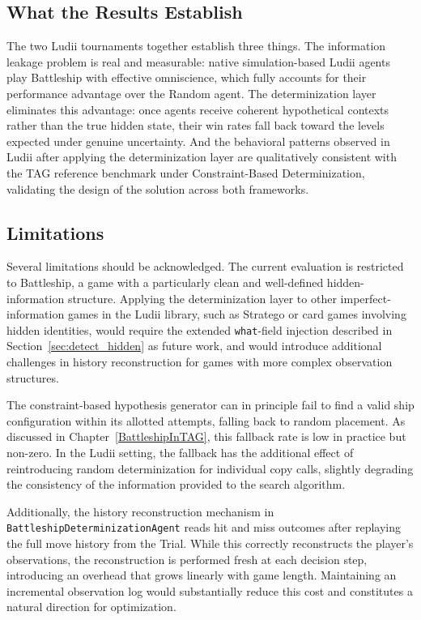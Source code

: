 \subsection{What the Results Establish}

The two Ludii tournaments together establish three things. The information leakage problem is real and measurable: native simulation-based Ludii agents play Battleship with effective omniscience, which fully accounts for their performance advantage over the Random agent. The determinization layer eliminates this advantage: once agents receive coherent hypothetical contexts rather than the true hidden state, their win rates fall back toward the levels expected under genuine uncertainty. And the behavioral patterns observed in Ludii after applying the determinization layer are qualitatively consistent with the TAG reference benchmark under Constraint-Based Determinization, validating the design of the solution across both frameworks.

\subsection{Limitations}

Several limitations should be acknowledged. The current evaluation is restricted to Battleship, a game with a particularly clean and well-defined hidden-information structure. Applying the determinization layer to other imperfect-information games in the Ludii library, such as Stratego or card games involving hidden identities, would require the extended \texttt{what}-field injection described in Section~\ref{sec:detect_hidden} as future work, and would introduce additional challenges in history reconstruction for games with more complex observation structures.

The constraint-based hypothesis generator can in principle fail to find a valid ship configuration within its allotted attempts, falling back to random placement. As discussed in Chapter~\ref{BattleshipInTAG}, this fallback rate is low in practice but non-zero. In the Ludii setting, the fallback has the additional effect of reintroducing random determinization for individual copy calls, slightly degrading the consistency of the information provided to the search algorithm.

Additionally, the history reconstruction mechanism in \newline
\texttt{BattleshipDeterminizationAgent} reads hit and miss 
outcomes after replaying the full move history from the Trial. 
While this correctly reconstructs the player's observations, 
the reconstruction is performed fresh at each decision step, 
introducing an overhead that grows linearly with game length. 
Maintaining an incremental observation log would substantially 
reduce this cost and constitutes a natural direction for 
optimization.


